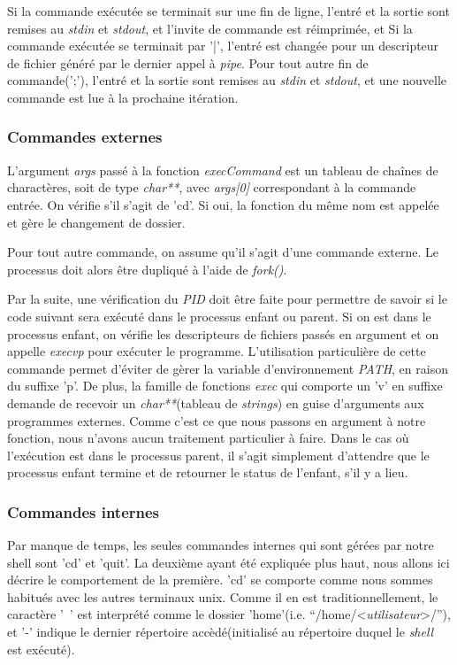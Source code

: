 \documentclass[letterpaper,12pt]{scrartcl}
\begin{document}
            Si la commande exécutée se terminait sur une fin de ligne, l'entré et la sortie sont remises au \textit{stdin} et \textit{stdout}, et l'invite de commande est réimprimée, et 
            Si la commande exécutée se terminait par '|', l'entré est changée pour un descripteur de fichier généré par le dernier appel à \textit{pipe}.
            Pour tout autre fin de commande(';'), l'entré et la sortie sont remises au \textit{stdin} et \textit{stdout}, et une nouvelle commande est lue à la prochaine itération.     
			
			\subsubsection{Commandes externes}
			L'argument \textit{args} passé à la fonction \textit{execCommand} est un tableau de chaînes de charactères, soit de type \textit{char**}, avec \textit{args[0]} correspondant à la commande entrée. On vérifie s'il s'agit de 'cd'. Si oui, la fonction du même nom est appelée et gère le changement de dossier.

            Pour tout autre commande, on assume qu'il s'agit d'une commande externe. Le processus doit alors être dupliqué à l'aide de \textit{fork()}.

			Par la suite, une vérification du \textit{PID} doit être faite pour permettre de savoir si le code suivant sera exécuté dans le processus enfant ou parent. Si on est dans le processus enfant, on vérifie les descripteurs de fichiers passés en argument et on appelle \textit{execvp} pour exécuter le programme. L'utilisation particulière de cette commande permet d'éviter de gèrer la variable d'environnement \textit{PATH}, en raison du suffixe 'p'. De plus, la famille de fonctions \textit{exec} qui comporte un 'v' en suffixe demande de recevoir un \textit{char**}(tableau de \textit{strings}) en guise d'arguments aux programmes externes. Comme c'est ce que nous passons en argument à notre fonction, nous n'avons aucun traitement particulier à faire. Dans le cas où l'exécution est dans le processus parent, il s'agit simplement d'attendre que le processus enfant termine et de retourner le status de l'enfant, s'il y a lieu.

			\subsubsection{Commandes internes}
			Par manque de temps, les seules commandes internes qui sont gérées par notre shell sont 'cd' et 'quit'. La deuxième ayant été expliquée plus haut, nous allons ici décrire le comportement de la première. 'cd' se comporte comme nous sommes habitués avec les autres terminaux unix. Comme il en est traditionnellement, le caractère '~' est interprété comme le dossier 'home'(i.e. ``/home/<\textit{utilisateur}>/''), et '-' indique le dernier répertoire accèdé(initialisé au répertoire duquel le \textit{shell} est exécuté).
\end{document}
